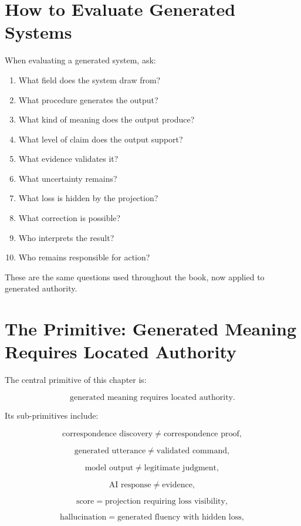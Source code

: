 \documentclass[11pt]{book}
\begin{document}
\section{How to Evaluate Generated Systems}

When evaluating a generated system, ask:

\begin{enumerate}[label=\arabic*.]
    \item What field does the system draw from?
    \item What procedure generates the output?
    \item What kind of meaning does the output produce?
    \item What level of claim does the output support?
    \item What evidence validates it?
    \item What uncertainty remains?
    \item What loss is hidden by the projection?
    \item What correction is possible?
    \item Who interprets the result?
    \item Who remains responsible for action?
\end{enumerate}

These are the same questions used throughout the book, now applied to generated authority.

\section{The Primitive: Generated Meaning Requires Located Authority}

The central primitive of this chapter is:

\[
\text{generated meaning requires located authority}.
\]

Its sub-primitives include:

\[
\text{correspondence discovery} \neq \text{correspondence proof},
\]

\[
\text{generated utterance} \neq \text{validated command},
\]

\[
\text{model output} \neq \text{legitimate judgment},
\]

\[
\text{AI response} \neq \text{evidence},
\]

\[
\text{score} = \text{projection requiring loss visibility},
\]

\[
\text{hallucination} = \text{generated fluency with hidden loss},
\]
\end{document}
